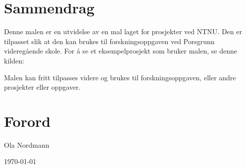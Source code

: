 \section*{Sammendrag}
Denne malen er en utvidelse av en mal laget for prosjekter ved NTNU.
Den er tilpasset slik at den kan brukes til forskningsoppgaven ved Porsgrunn videregående skole.
For å se et eksempelprosjekt som bruker malen, se denne kilden: \parencite{opg:nyboe}

Malen kan fritt tilpasses videre og brukes til forskningsoppgaven, eller andre prosjekter eller oppgaver.

\section*{Forord}

\lipsum[1]

\vfill

Ola Nordmann

\today{}


\newpage